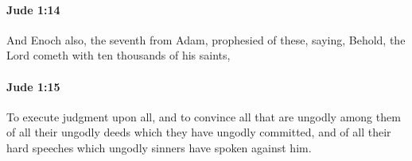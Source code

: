 		\paragraph{Jude 1:14} %
			\label{JUDE-1-14}

			And Enoch also, the seventh from Adam, prophesied of these, saying, Behold, the Lord cometh with ten thousands of his saints,

			\begin{framed}
			\scriptsize
				\begin{compactdesc}
					\item[SBLG] 
				\end{compactdesc}
			\end{framed}

		\paragraph{Jude 1:15} %
			\label{JUDE-1-15}

			To execute judgment upon all, and to convince all that are ungodly among them of all their ungodly deeds which they have ungodly committed, and of all their hard speeches which ungodly sinners have spoken against him.

